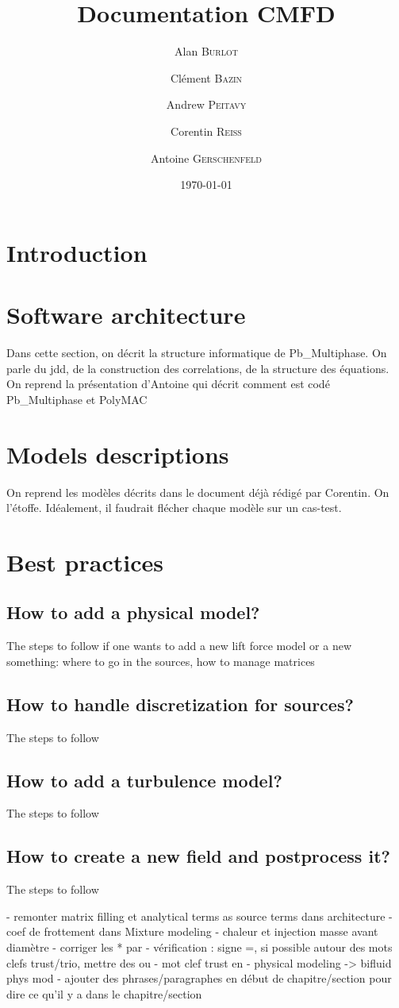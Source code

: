 \documentclass[a4paper,12pt]{article}
\title{Documentation CMFD}
\author{Alan \textsc{Burlot} \and Clément \textsc{Bazin} \and Andrew \textsc{Peitavy} \and Corentin \textsc{Reiss} \and Antoine \textsc{Gerschenfeld}}
\date{\today}
\begin{document}
\maketitle

\section{Introduction}

\section{Software architecture}
Dans cette section, on décrit la structure informatique de Pb\_Multiphase. On parle du jdd, de la construction des correlations, de la structure des équations. On reprend la présentation d'Antoine qui décrit comment est codé Pb\_Multiphase et PolyMAC

\section{Models descriptions}
On reprend les modèles décrits dans le document déjà rédigé par Corentin. On l'étoffe. Idéalement, il faudrait flécher chaque modèle sur un cas-test.

\section{Best practices}
\subsection{How to add a physical model?}
The steps to follow if one wants to add a new lift force model or a new something: where to go in the sources, how to manage matrices
\subsection{How to handle discretization for sources?}
The steps to follow
\subsection{How to add a turbulence model?}
The steps to follow
\subsection{How to create a new field and postprocess it?}
The steps to follow


- remonter matrix filling et analytical terms as source terms dans architecture
- coef de frottement dans Mixture modeling
- chaleur et injection masse avant diamètre
- corriger les * par \times
- vérification : signe =, si possible \text{} autour des mots clefs trust/trio, mettre des \parent{} ou \croc{} 
- mot clef trust en \texttt{}
- physical modeling -> bifluid phys mod
- ajouter des phrases/paragraphes en début de chapitre/section pour dire ce qu'il y a dans le chapitre/section
\end{document}
